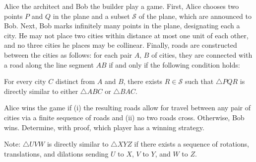 Alice the architect and Bob the builder play a game. First, Alice chooses two points $P$ and $Q$ in the plane and a subset $\mathcal{S}$ of the plane, which are announced to Bob. Next, Bob marks infinitely many points in the plane, designating each a city. He may not place two cities within distance at most one unit of each other, and no three cities he places may be collinear. Finally, roads are constructed between the cities as follows: for each pair $A,\,B$ of cities, they are connected with a road along the line segment $AB$ if and only if the following condition holds:
\begin{center}
For every city $C$ distinct from $A$ and $B$, there exists $R\in\mathcal{S}$ such
that $\triangle PQR$ is directly similar to either $\triangle ABC$ or $\triangle BAC$.
\end{center}
Alice wins the game if (i) the resulting roads allow for travel between any pair of cities via a finite sequence of roads and (ii) no two roads cross. Otherwise, Bob wins. Determine, with proof, which player has a winning strategy.

Note: $\triangle UVW$ is directly similar to $\triangle XYZ$ if there exists a sequence of rotations, translations, and dilations sending $U$ to $X$, $V$ to $Y$, and $W$ to $Z$.